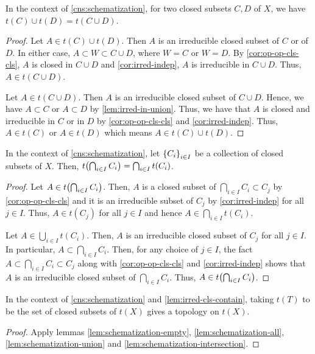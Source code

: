 \begin{lem}\label{lem:schematization-union}
In the context of \cref{cns:schematization},
for two closed subsets $C, D$ of $X$, we have
$t(C) \cup t(D) = t(C \cup D)$.
\end{lem}
\begin{proof}
Let $A \in t(C) \cup t(D)$. Then $A$ is an irreducible
closed subset of $C$ or of $D$. In either case,
$A \subset W \subset C \cup D$, where $W = C$ or $W = D$.
By \cref{cor:op-op-cls-cls}, $A$ is closed in $C \cup D$
and \cref{cor:irred-indep}, $A$ is irreducible in $C \cup D$.
Thus, $A \in t(C \cup D)$.

Let $A \in t(C \cup D)$. Then $A$ is an irreducible closed subset
of $C \cup D$. Hence, we have $A \subset C$ or $A \subset D$
by \cref{lem:irred-in-union}. Thus, we have that
$A$ is closed and irreducible in $C$ or in $D$ by
\cref{cor:op-op-cls-cls} and \cref{cor:irred-indep}.
Thus, $A \in t(C)$ or $A \in t(D)$ which means $A \in t(C) \cup t(D)$.
\end{proof}

\begin{lem}\label{lem:schematization-intersection}
In the context of \cref{cns:schematization}, let $\set{C_i}_{i \in I}$
be a collection of closed subsets of $X$. Then,
$t\br{\bigcap_{i \in I} C_i} = \bigcap_{i \in I} t(C_i)$.
\end{lem}
\begin{proof}
Let $A \in t\br{\bigcap_{i \in I} C_i}$. Then, $A$ is a closed subset of
$\bigcap_{i \in I} C_i \subset C_j$ by
\cref{cor:op-op-cls-cls} and it is an irreducible subset of $C_j$
by \cref{cor:irred-indep} for all $j \in I$. Thus, $A \in t(C_j)$ for
all $j \in I$ and hence $A \in \bigcap_{i \in I} t(C_i)$.

Let $A \in \bigcup_{i \in I} t(C_i)$. Then, $A$ is an irreducible
closed subset of $C_j$ for all $j \in I$. In particular,
$A \subset \bigcap_{i \in I} C_i$. Then, for any choice of $j \in I$,
the fact  $A \subset \bigcap_{i \in I} C_i \subset C_j$ along with
\cref{cor:op-op-cls-cls} and \cref{cor:irred-indep} shows that
$A$ is an irreducible closed subset of $\bigcap_{i \in I} C_i$.
Thus, $A \in t\br{\bigcap_{i \in I} C_i}$.
\end{proof}

\begin{thm}\label{thm:schematization-topology}
In the context of \cref{cns:schematization} and \cref{lem:irred-cls-contain},
taking $t(T)$ to be the set of closed subsets of $t(X)$
gives a topology on $t(X)$.
\end{thm}
\begin{proof}
Apply lemmas \ref{lem:schematization-empty},
\ref{lem:schematization-all},
\ref{lem:schematization-union} and
\ref{lem:schematization-intersection}.
\end{proof}

